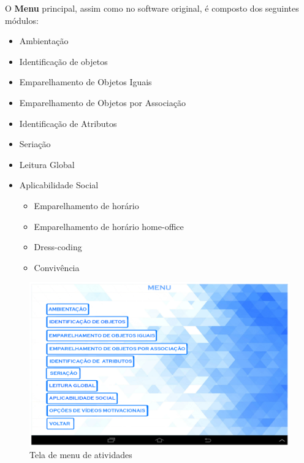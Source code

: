 \documentclass[12pt]{article}
\begin{document}
O \textbf{Menu} principal, assim como no software original, é composto dos seguintes módulos:
\begin{itemize}
    \item Ambientação
    \item Identificação de objetos
    \item Emparelhamento de Objetos Iguais
    \item Emparelhamento de Objetos por Associação
    \item Identificação de Atributos
    \item Seriação
    \item Leitura Global
    \item Aplicabilidade Social
    \begin{itemize}
        \item Emparelhamento de horário
        \item Emparelhamento de horário home-office
        \item Dress-coding
        \item Convivência
    \end{itemize}
        
\end{itemize}
 \begin{figure}[h!]
    \centering
    \includegraphics[width=1.0\textwidth]{menu.png}
    \caption{ Tela de menu de atividades }
    \label{fig:menu}
\end{figure}
\end{document}
